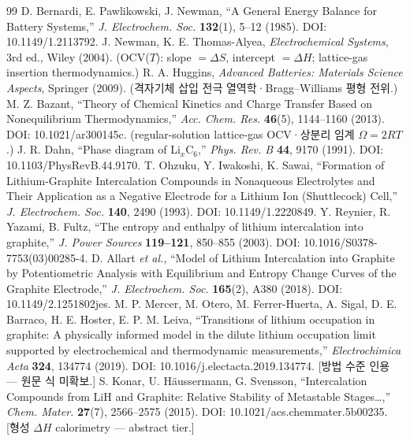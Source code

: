 \begin{thebibliography}{99}
 D. Bernardi, E. Pawlikowski, J. Newman, ``A General Energy Balance for Battery Systems,'' \emph{J. Electrochem. Soc.} \textbf{132}(1), 5--12 (1985). DOI: 10.1149/1.2113792.
 J. Newman, K. E. Thomas-Alyea, \emph{Electrochemical Systems}, 3rd ed., Wiley (2004). (OCV($T$): slope $=\Delta S$, intercept $=\Delta H$; lattice-gas insertion thermodynamics.)
 R. A. Huggins, \emph{Advanced Batteries: Materials Science Aspects}, Springer (2009). (격자기체 삽입 전극 열역학·Bragg--Williams 평형 전위.)
 M. Z. Bazant, ``Theory of Chemical Kinetics and Charge Transfer Based on Nonequilibrium Thermodynamics,'' \emph{Acc. Chem. Res.} \textbf{46}(5), 1144--1160 (2013). DOI: 10.1021/ar300145c. (regular-solution lattice-gas OCV·상분리 임계 $\Omega=2RT$.)
 J. R. Dahn, ``Phase diagram of Li$_x$C$_6$,'' \emph{Phys. Rev. B} \textbf{44}, 9170 (1991). DOI: 10.1103/PhysRevB.44.9170.
 T. Ohzuku, Y. Iwakoshi, K. Sawai, ``Formation of Lithium-Graphite Intercalation Compounds in Nonaqueous Electrolytes and Their Application as a Negative Electrode for a Lithium Ion (Shuttlecock) Cell,'' \emph{J. Electrochem. Soc.} \textbf{140}, 2490 (1993). DOI: 10.1149/1.2220849.
 Y. Reynier, R. Yazami, B. Fultz, ``The entropy and enthalpy of lithium intercalation into graphite,'' \emph{J. Power Sources} \textbf{119--121}, 850--855 (2003). DOI: 10.1016/S0378-7753(03)00285-4.
 D. Allart \emph{et al.}, ``Model of Lithium Intercalation into Graphite by Potentiometric Analysis with Equilibrium and Entropy Change Curves of the Graphite Electrode,'' \emph{J. Electrochem. Soc.} \textbf{165}(2), A380 (2018). DOI: 10.1149/2.1251802jes.
 M. P. Mercer, M. Otero, M. Ferrer-Huerta, A. Sigal, D. E. Barraco, H. E. Hoster, E. P. M. Leiva, ``Transitions of lithium occupation in graphite: A physically informed model in the dilute lithium occupation limit supported by electrochemical and thermodynamic measurements,'' \emph{Electrochimica Acta} \textbf{324}, 134774 (2019). DOI: 10.1016/j.electacta.2019.134774. [방법 수준 인용 --- 원문 식 미확보.]
 S. Konar, U. Häussermann, G. Svensson, ``Intercalation Compounds from LiH and Graphite: Relative Stability of Metastable Stages\ldots,'' \emph{Chem. Mater.} \textbf{27}(7), 2566--2575 (2015). DOI: 10.1021/acs.chemmater.5b00235. [형성 $\Delta H$ calorimetry --- abstract tier.]

\end{thebibliography}
